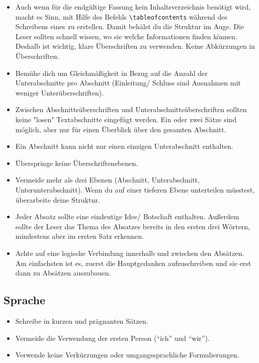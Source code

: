 \begin{itemize}
\item  Auch wenn für die endgültige Fassung kein Inhaltsverzeichnis benötigt wird, macht es Sinn, mit Hilfe des Befehls 
{\tt \textbackslash tableofcontents} während des Schreibens eines zu erstellen. Damit behälst du die Struktur im Auge.
Die Leser sollten schnell wissen, wo sie welche Informationen finden können. Deshalb ist wichtig, klare Überschriften zu verwenden. Keine Abkürzungen in Überschriften.

\item Bemühe dich um Gleichmäßigkeit in Bezug auf die Anzahl der Unterabschnitte pro Abschnitt (Einleitung/ Schluss sind Ausnahmen mit weniger Unterüberschriften). 

\item Zwischen Abschnitts\-über\-schriften und Unter\-ab\-schnitts\-überschriften sollten keine "losen" Textabschnitte eingefügt werden. Ein oder zwei Sätze sind möglich, aber nur für einen Überblick über den gesamten Abschnitt.

\item Ein Abschnitt kann nicht nur einen einzigen Unterabschnitt enthalten.

\item Überspringe keine Überschriftenebenen.

\item Vermeide mehr als drei Ebenen (Abschnitt, Unterabschnitt, Unterunterabschnitt). Wenn du auf einer tieferen Ebene unterteilen müsstest, überarbeite deine Struktur.

\item Jeder Absatz sollte eine eindeutige Idee/ Botschaft enthalten. Außerdem sollte der Leser das Thema des Absatzes bereits in den ersten drei Wörtern, mindestens aber im ersten Satz erkennen.

\item Achte  auf eine logische Verbindung innerhalb und zwischen den Absätzen. Am einfachsten ist es, zuerst die Hauptgedanken aufzuschreiben und sie erst dann zu Absätzen auszubauen.

\end{itemize}

\subsection{Sprache}
\begin{itemize}
	
	\item Schreibe in kurzen und prägnanten Sätzen. 
	
\item Vermeide die Verwendung der ersten Person (``ich'' und ``wir'').
	
	\item Verwende keine Verkürzungen oder umgangssprachliche Formulierungen.

\end{itemize}

